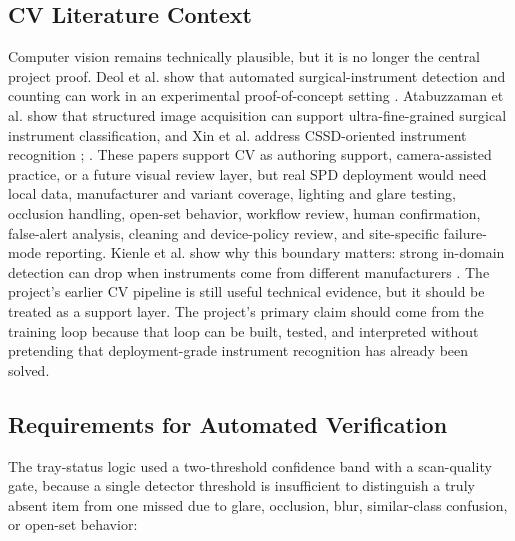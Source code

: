 \documentclass[10pt,a4paper]{article}
\begin{document}
\subsection{CV Literature Context}

Computer vision remains technically plausible, but it is no longer the central
project proof. Deol et al. show that automated surgical-instrument detection and
counting can work in an experimental proof-of-concept setting
\cite{deol-et-al-2024}. Atabuzzaman et al.
show that structured image acquisition can support ultra-fine-grained surgical
instrument classification, and Xin et al. address CSSD-oriented instrument
recognition
\cite{atabuzzaman-et-al-2025};
\cite{xin-et-al-2024}. These papers support CV as authoring support, camera-assisted practice, or a
future visual review layer, but real SPD deployment would need local data,
manufacturer and variant coverage, lighting and glare testing, occlusion
handling, open-set behavior, workflow review, human confirmation, false-alert
analysis, cleaning and device-policy review, and site-specific failure-mode
reporting. Kienle et al. show why this boundary
matters: strong in-domain detection can drop when instruments come from
different manufacturers
\cite{kienle-et-al-2025}.
The project's earlier CV pipeline is still useful technical evidence, but it
should be treated as a support layer. The project's primary claim should come from
the training loop because that loop can be built, tested, and interpreted
without pretending that deployment-grade instrument recognition has already
been solved.
\subsection{Requirements for Automated Verification}
\label{sec:requirements-for-automated-verification}
The tray-status logic used a two-threshold confidence band with a scan-quality
gate, because a single detector threshold is insufficient to distinguish a
truly absent item from one missed due to glare, occlusion, blur, similar-class
confusion, or open-set behavior:
\end{document}
